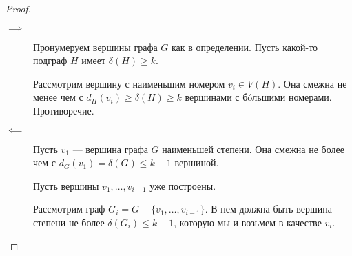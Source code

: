 \begin{proof}
    \begin{description}
		\item[$ \implies$ ] Пронумеруем вершины графа $G$ как в определении.
			Пусть какой-то подграф  $ H$ имеет $\delta(H) \ge k$.

			Рассмотрим вершину с наименьшим номером $v_i \in V(H)$. Она смежна не менее чем с $d_H(v_i) \ge \delta(H) \ge k$ вершинами с б\'oльшими номерами. Противоречие. 
		\item [$ \impliedby$ ] Пусть $v_1$ --- вершина графа  $G$ наименьшей степени.
			Она смежна не более чем с $d_G(v_1)=\delta(G) \le k-1$ вершиной.

			Пусть вершины $v_1, \ldots , v_{i-1} $ уже построены. 

			Рассмотрим граф $G_i = G - \{v_1, \ldots , v_{i-1}\}$. В нем должна быть вершина степени не более $\delta(G_i) \le  k-1$, которую мы и возьмем в качестве $v_i$.
    \end{description}
\end{proof}
